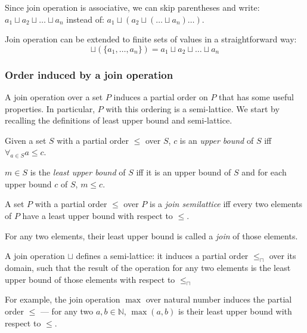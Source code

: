 Since join operation is associative, we can skip parentheses and write: $ a_1 \sqcup a_2 \sqcup \dots \sqcup a_n$ instead of: $ a_1 \sqcup (a_2 \sqcup ( \dots \sqcup a_n) \dots )$.

Join operation can be extended to finite sets of values in a straightforward way:
$$\sqcup(\{a_1, \dots, a_n \}) = a_1 \sqcup a_2 \sqcup \dots \sqcup a_n$$

\subsubsection{Order induced by a join operation}

A join operation over a set $P$ induces a partial order on $P$ that has some useful properties. In particular, $P$ with this ordering is a semi-lattice. We start by recalling the definitions of least upper bound and semi-lattice.

\begin{defn}
Given a set $S$ with a partial order $\le$ over $S$, $c$ is an \emph{upper bound} of $S$ iff $\forall_{a \in S} a \le c$.

$m \in S$ is the \emph{least upper bound} of $S$ iff it is an upper bound of $S$ and for each upper bound $c$ of $S$, $m \le c$.
\end{defn}

\begin{defn}
A set $P$ with a partial order $\le$ over $P$ is a \emph{join semilattice} iff every two elements of $P$ have a least upper bound with respect to $\le$.
\end{defn}

For any two elements, their least upper bound is called a \emph{join} of those elements.

A join operation $\sqcup$ defines a semi-lattice: it induces a partial order $\le_\sqcap$ over its domain, such that the result of the operation for any two elements is the least upper bound of those elements with respect to $\le_\sqcap$

For example, the join operation $\max$ over natural number induces the partial order $\le$ --- for any two $a, b \in \mathbb{N}$, $\max(a, b)$ is their least upper bound with respect to $\le$.


